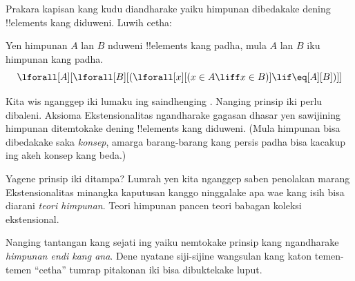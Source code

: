 \documentclass[../../../include/open-logic-section]{subfiles}
\begin{document}

Prakara kapisan kang kudu diandharake yaiku himpunan dibedakake
dening !!{element}s kang diduweni. Luwih cetha:

\begin{axiom}[Ekstensionalitas]
Yen himpunan $A$ lan $B$ nduweni !!{element}s kang padha, mula $A$
lan $B$ iku himpunan kang padha.
\[
  \lforall[A][\lforall[B][(\lforall[x][(x \in A \liff x \in B)] \lif
  \eq[A][B])]]
\]
\end{axiom}

Kita wis nganggep iki lumaku ing saindhenging .
Nanging prinsip iki perlu dibaleni. Aksioma Ekstensionalitas
ngandharake gagasan dhasar yen sawijining himpunan ditemtokake
dening !!{element}s kang diduweni. (Mula himpunan bisa dibedakake saka
\emph{konsep}, amarga barang-barang kang persis padha bisa
kacakup ing akeh konsep kang beda.)

Yagene prinsip iki ditampa? Lumrah yen kita nganggep saben
penolakan marang Ekstensionalitas minangka kaputusan kanggo
ninggalake apa wae kang isih bisa diarani \emph{teori himpunan}.
Teori himpunan pancen teori babagan koleksi ekstensional.

Nanging tantangan kang sejati ing  yaiku
nemtokake prinsip kang ngandharake \emph{himpunan endi kang ana}.
Dene nyatane siji-sijine wangsulan kang katon temen-temen
``cetha'' tumrap pitakonan iki bisa dibuktekake luput.
\end{document}
